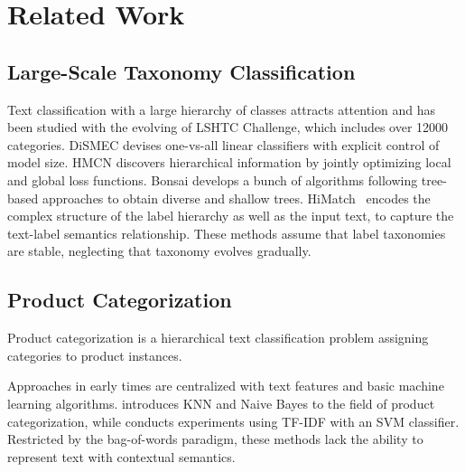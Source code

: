 \section{Related Work}
\subsection{Large-Scale Taxonomy Classification} 
Text classification with a large hierarchy of classes attracts attention and has been studied with the evolving of LSHTC \cite{partalas2015lshtc} Challenge, which includes 
over 12000 categories. DiSMEC \cite{babbar2017dismec} devises one-vs-all linear classifiers 
with explicit control of model size. 
HMCN \cite{wehrmann2018hierarchical} discovers hierarchical information by jointly optimizing local and global loss functions.
Bonsai \cite{khandagale2020bonsai} develops a bunch of algorithms following tree-based approaches to obtain diverse and shallow trees. HiMatch~\cite{chen2021hierarchy} encodes the complex structure of the label hierarchy as well as the input text, to capture the text-label semantics relationship. These methods assume that label taxonomies are stable, neglecting that 
taxonomy evolves gradually. 

\subsection{Product Categorization}
Product categorization is a hierarchical text classification problem assigning categories to product instances. 

Approaches in early times are centralized with text features and basic machine learning algorithms. \cite{ding2002goldenbullet} introduces KNN and Naive Bayes to the field of product categorization, while \cite{yu2012product} 
conducts experiments using TF-IDF with an SVM classifier. Restricted by the bag-of-words paradigm, these methods lack the ability to represent text with contextual semantics.


